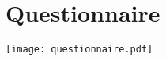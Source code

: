 \documentclass[]{article}
\begin{document}
\section{Questionnaire}

\begin{adjustbox}{width=1\textwidth}
\texttt{[image: questionnaire.pdf]}
\end{adjustbox}

\newpage
\end{document}
